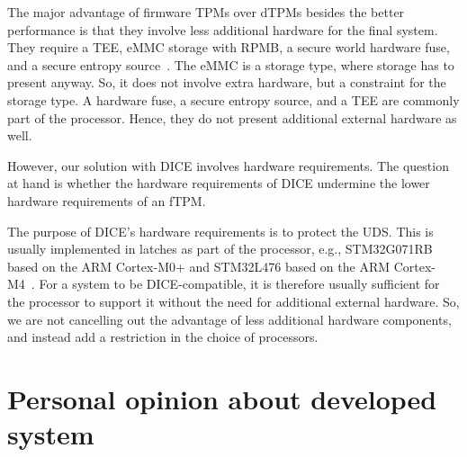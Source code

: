The major advantage of firmware TPMs over dTPMs besides the better performance is that they involve less additional hardware for the final system.
They require a TEE, eMMC storage with RPMB, a secure world hardware fuse, and a secure entropy source~\cite{Raj2015}.
The eMMC is a storage type, where storage has to present anyway.
So, it does not involve extra hardware, but a constraint for the storage type. %
A hardware fuse, a secure entropy source, and a TEE are commonly part of the processor.
Hence, they do not present additional external hardware as well.

However, our solution with DICE involves hardware requirements.
The question at hand is whether the hardware requirements of DICE undermine the lower hardware requirements of an fTPM\@.

The purpose of DICE's hardware requirements is to protect the UDS\@.
This is usually implemented in latches as part of the processor, e.g., STM32G071RB based on the ARM Cortex-M0+ and STM32L476 based on the ARM Cortex-M4~\cite{Lorych2022}.
For a system to be DICE-compatible, it is therefore usually sufficient for the processor to support it without the need for additional external hardware.
So, we are not cancelling out the advantage of less additional hardware components, and instead add a restriction in the choice of processors.

\section{Personal opinion about developed system}


